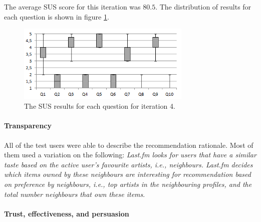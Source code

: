 The average SUS score for this iteration was $80.5$. The distribution of results for each question is shown in figure \ref{fig:iterations_sus_scores_it4_boxplots}.

\begin{figure}
	\begin{center}
		\includegraphics[width=8.3cm]{img/iterations_sus_scores_it4_boxplots}
	\end{center}
	\caption{The SUS results for each question for iteration 4.}
	\label{fig:iterations_sus_scores_it4_boxplots}
\end{figure}


\paragraph{Transparency}

All of the test users were able to describe the recommendation rationale. Most of them used a variation on the following: \textit{Last.fm looks for users that have a similar taste based on the active user's favourite artists, i.e., neighbours. Last.fm decides which items owned by these neighbours are interesting for recommendation based on preference by neighbours, i.e., top artists in the neighbouring profiles, and the total number neighbours that own these items}.


\paragraph{Trust, effectiveness, and persuasion}


